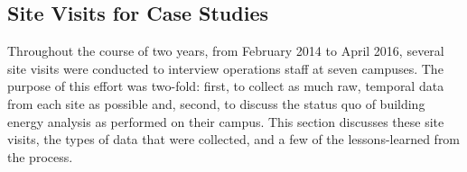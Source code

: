 \subsection{Site Visits for Case Studies}
\label{sec:sitevisit}
Throughout the course of two years, from February 2014 to April 2016, several site visits were conducted to interview operations staff at seven campuses. The purpose of this effort was two-fold: first, to collect as much raw, temporal data from each site as possible and, second, to discuss the status quo of building energy analysis as performed on their campus. This section discusses these site visits, the types of data that were collected, and a few of the lessons-learned from the process.
